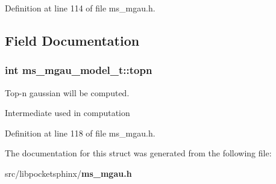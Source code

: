 Definition at line 114 of file ms\-\_\-mgau.\-h.



\subsection{Field Documentation}
\subsubsection[{topn}]{\setlength{\rightskip}{0pt plus 5cm}int ms\-\_\-mgau\-\_\-model\-\_\-t\-::topn}\label{structms__mgau__model__t_a0a67ef79bd74c55734b0944f0d61b668}


Top-\/n gaussian will be computed. 

Intermediate used in computation 

Definition at line 118 of file ms\-\_\-mgau.\-h.



The documentation for this struct was generated from the following file\-:\begin{DoxyCompactItemize}
\item 
src/libpocketsphinx/{\bf ms\-\_\-mgau.\-h}\end{DoxyCompactItemize}
